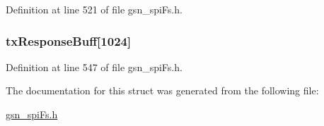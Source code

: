 Definition at line 521 of file gsn\_\-spiFs.h.

\hypertarget{a00232_a418903feeb7dca190e9d0c667f19c719}{
\subsubsection[{txResponseBuff}]{ {\bf txResponseBuff}\mbox{[}1024\mbox{]}}}
\label{a00232_a418903feeb7dca190e9d0c667f19c719}


Definition at line 547 of file gsn\_\-spiFs.h.



The documentation for this struct was generated from the following file:\begin{DoxyCompactItemize}
\item 
\hyperlink{a00589}{gsn\_\-spiFs.h}\end{DoxyCompactItemize}
